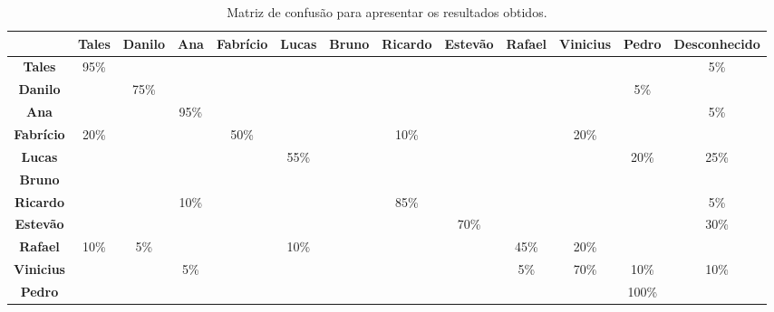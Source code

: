 	\begin{landscape}
	\begin{table}[htb]
		\begin{center}
			\caption{Matriz de confusão para apresentar os resultados obtidos.}
			\label{tab:matriz-confusao}
			\begin{tabular}{|c|c|c|c|c|c|c|c|c|c|c|c|c|}
				\hline  & \bf Tales & \bf Danilo & \bf Ana & \bf Fabrício & \bf Lucas & \bf Bruno & \bf Ricardo & \bf Estevão & \bf Rafael & \bf Vinicius & \bf Pedro & \bf Desconhecido\\
				\hline \bf Tales 		& 95\% & 			& 		 & 			& & & 		 & & 		 & 			& 		 & 5\%\\
				\hline \bf Danilo 	& 		 & 75\% & 		 & 			& & & 		 & & 		 & 			& 5\%  &		\\
				\hline \bf Ana 			& 		 & 			& 95\% & 			& & & 		 & & 		 & 			& 		 & 5\%\\
				\hline \bf Fabrício & 20\% & 			& 		 & 50\% & & & 10\% & & 		 & 20\% & 		 &		\\
				\hline \bf Lucas 		& 		 & 			& 		 & 			& 55\% & & 		 & & 		 & 			& 	20\%	 &	25\%	\\
				\hline \bf Bruno 		& 		 & 			& 		 & 			& & & 		 & & 		 & 			& 		 &		\\
				\hline \bf Ricardo 	& 		 & 			& 10\% & 			& & & 85\% & & 		 & 			& 		 & 5\%\\
				\hline \bf Estevão 	& 		 & 			& 		 & 			& & & 		 & 70\% & 		 & 			& 		 & 30\%\\
				\hline \bf Rafael 	& 10\% & 	5\%	& 		 & 			& 10\% & & 		 & & 	45\%	 & 	20\%	& 		 &		\\
				\hline \bf Vinicius & 		 & 			& 5\%  & 			& & & 		 & & 5\% & 70\% & 10\% & 10\%\\
				\hline \bf Pedro 		& 		 & 			& 		 & 			& & & 		 & & 		 & 			& 	100\%	 &		\\
				\hline
			\end{tabular}
		\end{center}
	\end{table}
	\end{landscape}
